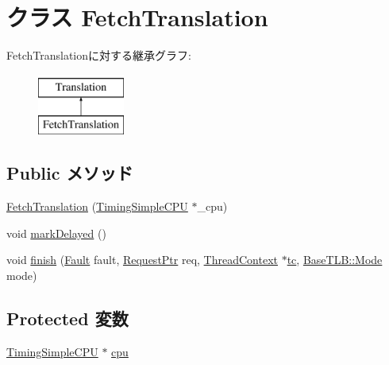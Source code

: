 \hypertarget{classTimingSimpleCPU_1_1FetchTranslation}{
\section{クラス FetchTranslation}
\label{classTimingSimpleCPU_1_1FetchTranslation}
}
FetchTranslationに対する継承グラフ:\begin{figure}[H]
\begin{center}
\leavevmode
\includegraphics[height=2cm]{classTimingSimpleCPU_1_1FetchTranslation}
\end{center}
\end{figure}
\subsection*{Public メソッド}
\begin{DoxyCompactItemize}
\item 
\hyperlink{classTimingSimpleCPU_1_1FetchTranslation_a03b971fd63881d33f972ba3f025fb520}{FetchTranslation} (\hyperlink{classTimingSimpleCPU_1_1TimingSimpleCPU}{TimingSimpleCPU} $\ast$\_\-cpu)
\item 
void \hyperlink{classTimingSimpleCPU_1_1FetchTranslation_ad1fd11d1e352cfc4b329d29b46a19fc4}{markDelayed} ()
\item 
void \hyperlink{classTimingSimpleCPU_1_1FetchTranslation_a01e7d945def8d2e5df87a169954fa89f}{finish} (\hyperlink{classRefCountingPtr}{Fault} fault, \hyperlink{classRequest}{RequestPtr} req, \hyperlink{classThreadContext}{ThreadContext} $\ast$\hyperlink{classBaseSimpleCPU_a4455a4759e69e5ebe68ae7298cbcc37d}{tc}, \hyperlink{classBaseTLB_a46c8a310cf4c094f8c80e1cb8dc1f911}{BaseTLB::Mode} mode)
\end{DoxyCompactItemize}
\subsection*{Protected 変数}
\begin{DoxyCompactItemize}
\item 
\hyperlink{classTimingSimpleCPU_1_1TimingSimpleCPU}{TimingSimpleCPU} $\ast$ \hyperlink{classTimingSimpleCPU_1_1FetchTranslation_ace3e131319475077fac2fa861708b0c9}{cpu}
\end{DoxyCompactItemize}


